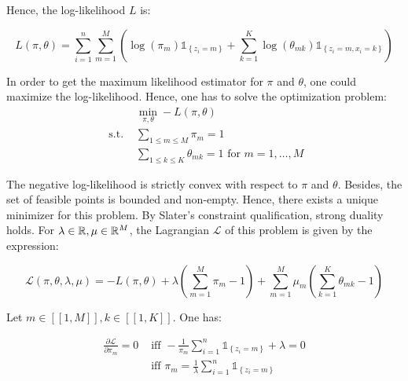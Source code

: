 \documentclass[a4paper, 11pt]{article}
\begin{document}
Hence, the log-likelihood $L$ is:

\begin{equation*}
    L \left( \pi, \theta \right) = \sum_{i=1}^{n} \sum_{m=1}^{M} \left( \log(\pi_m) \mathds{1}_{\left\{ z_i = m \right\}} + \sum_{k=1}^{K} \log(\theta_{mk}) \mathds{1}_{\left\{ z_i = m, x_i = k \right\}} \right)
\end{equation*}
\vspace*{.6em}

In order to get the maximum likelihood estimator for $\pi$ and $\theta$, one could maximize the log-likelihood. Hence, one has to solve the optimization problem: \\

\begin{equation*}
    \begin{aligned}
    & \min_{\pi, \theta} - L \left( \pi, \theta \right) \\
    \text{ s.t. } & \sum_{1 \leq m \leq M} \pi_{m} = 1 \\
    & \sum_{1 \leq k \leq K} \theta_{mk} = 1 \text{ for } m = 1, \dots, M
    \end{aligned}
\end{equation*}
\vspace*{.9em}

The negative log-likelihood is strictly convex with respect to $\pi$ and $\theta$. Besides, the set of feasible points is bounded and non-empty. Hence, there exists a unique minimizer for this problem. By Slater's constraint qualification, strong duality holds. For $\lambda \in \mathbb{R}, \mu \in \mathbb{R}^{M}$, the Lagrangian $\mathcal{L}$ of this problem is given by the expression:

\begin{equation*}
    \mathcal{L} \left( \pi, \theta, \lambda, \mu \right) = - L \left( \pi, \theta \right) + \lambda \left( \sum_{m=1}^{M} \pi_{m} - 1 \right) + \sum_{m=1}^{M} \mu_{m} \left( \sum_{k=1}^{K} \theta_{mk} - 1 \right)
\end{equation*}
\vspace*{.6em}

Let $m \in [\![ 1, M ]\!], k \in [\![ 1, K ]\!]$. One has:

\begin{equation*}
    \begin{aligned}
    \frac{\partial \mathcal{L}}{\partial \pi_{m}} = 0 &\text{ iff } - \frac{1}{\pi_m} \sum_{i=1}^{n} \mathds{1}_{\left\{ z_i = m \right\}} + \lambda = 0 \\
    &\text{ iff } \pi_m = \frac{1}{\lambda} \sum_{i=1}^{n} \mathds{1}_{\left\{ z_i = m \right\}}
    \end{aligned}
\end{equation*}
\end{document}
